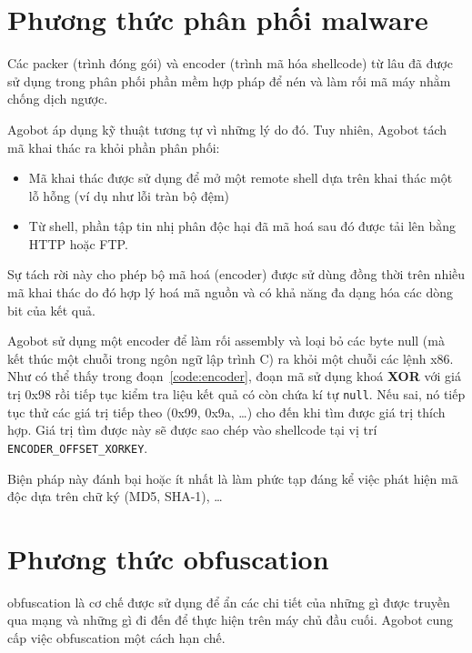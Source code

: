 \section{Phương thức phân phối malware}
Các \gls{packer} (trình đóng gói) và \gls{encoder} (trình mã hóa shellcode) từ lâu đã được sử dụng
trong phân phối phần mềm hợp pháp để nén và làm rối mã máy nhằm chống dịch ngược.

Agobot áp dụng kỹ thuật tương tự vì những lý do đó.
Tuy nhiên, Agobot tách mã khai thác ra khỏi phần phân phối:

\begin{itemize}
\item Mã khai thác được sử dụng để mở một remote shell dựa trên khai thác
một lỗ hỗng (ví dụ như lỗi tràn bộ đệm)
\item Từ shell, phần tập tin nhị phân độc hại đã mã hoá sau đó được tải lên bằng HTTP hoặc FTP.
\end{itemize}

Sự tách rời này cho phép bộ mã hoá (encoder) được sử dùng đồng thời trên
nhiều mã khai thác do đó hợp lý hoá mã nguồn
và có khả năng đa dạng hóa các dòng bit của kết quả.

Agobot sử dụng một \gls{encoder} để làm rối \gls{assembly} và loại bỏ các byte null
(mà kết thúc một chuỗi trong ngôn ngữ lập trình C) ra khỏi một chuỗi các lệnh x86.
Như có thể thấy trong đoạn~\ref{code:encoder}, đoạn mã sử dụng khoá \textbf{XOR} với giá trị 0x98 rồi tiếp tục kiểm tra liệu kết quả có còn chứa kí tự \texttt{null}.
Nếu sai, nó tiếp tục thử các giá trị tiếp theo (0x99, 0x9a, \ldots) cho đến khi tìm được giá trị thích hợp.
Giá trị tìm được này sẽ được sao chép vào shellcode tại vị trí \texttt{ENCODER\_OFFSET\_XORKEY}.

Biện pháp này đánh bại hoặc ít nhất là làm phức tạp đáng kể việc phát hiện mã độc dựa trên chữ ký (MD5, SHA-1), \dots


\section{Phương thức obfuscation}
\Gls{obfuscation} là cơ chế được sử dụng để ẩn các chi tiết của những gì được
truyền qua mạng và những gì đi đến để thực hiện trên máy chủ đầu cuối.
Agobot cung cấp việc \gls{obfuscation} một cách hạn chế.

